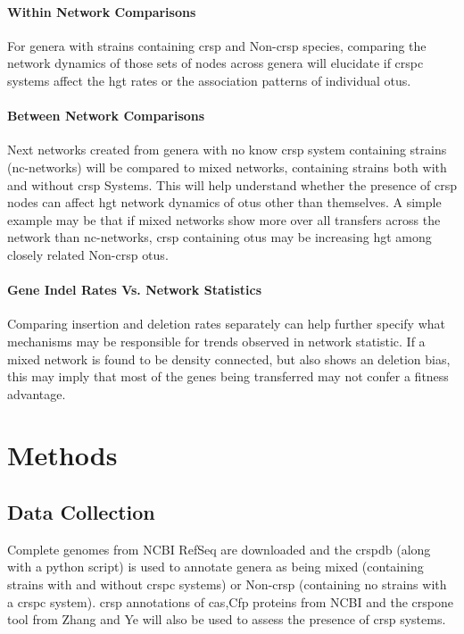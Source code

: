 \documentclass[12pt,letter]{article}
\begin{document}
\paragraph*{Within Network Comparisons}%
For genera with strains containing \ac{crsp} and Non-\ac{crsp} species, comparing the network dynamics of those sets of nodes across genera will elucidate if \ac{crspc} systems affect the \ac{hgt} rates or the association patterns of individual \ac{otu}s.
\paragraph*{Between Network Comparisons}%
Next networks created from genera with no know \ac{crsp} system containing strains (nc-networks) will be compared to mixed networks, containing strains both with and without \ac{crsp} Systems.
This will help understand whether the presence of \ac{crsp} nodes can affect \ac{hgt} network dynamics of \ac{otu}s other than themselves.
A simple example may be that if mixed networks show more over all transfers across the network than nc-networks, \ac{crsp} containing \ac{otu}s may be increasing \ac{hgt} among closely related Non-\ac{crsp} \ac{otu}s.
\paragraph*{Gene Indel Rates Vs. Network Statistics}%
Comparing insertion and  deletion rates separately can help further specify what mechanisms may be responsible for trends observed in network statistic.
If a mixed network is found to be density connected, but also shows an deletion bias, this may imply that most of the genes being transferred may not confer a fitness advantage.
\section{\huge Methods}
\subsection{Data Collection}
Complete genomes from NCBI RefSeq are downloaded and the \ac{crsp}db (along with a python script) is used to annotate genera as being mixed (containing strains with and without \ac{crspc} systems) or Non-\ac{crsp} (containing no strains with a \ac{crspc} system)\citep{crispdb}.
\ac{crsp} annotations of \ac{cas},Cfp proteins from NCBI and the \ac{crsp}one tool from Zhang and Ye will also be used to assess the presence of \ac{crsp} systems\citep{ineqcas}.
\end{document}
